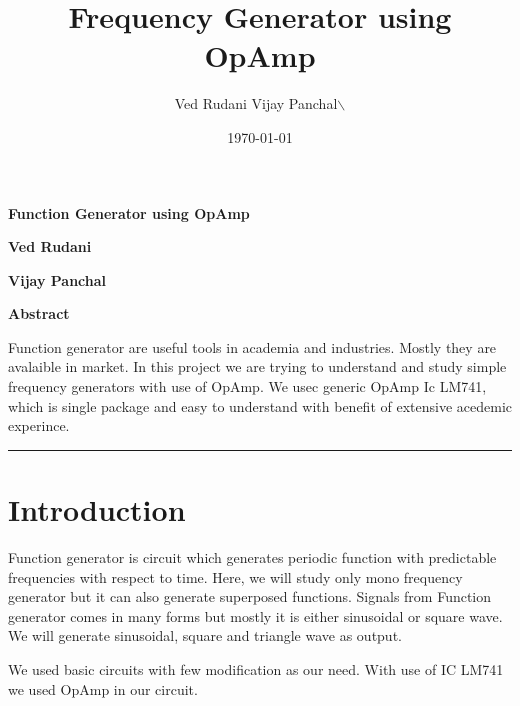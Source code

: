 \documentclass{article}
\author{Ved Rudani Vijay Panchal$\backslash$}
\date{\today}
\title{Frequency Generator using OpAmp}
\begin{document}
\maketitle
\tableofcontents

\pagebreak

\begin{center}
\Large
\textbf{Function Generator using OpAmp}


\vspace{0.9cm}
\normalsize
\textbf{Ved Rudani}


\textbf{Vijay Panchal}


\vspace{1.5cm}


\colorbox{bg1}{
\begin{minipage}{1\textwidth}\centering
        \vspace{1.5cm}
        \Large
        \textbf{Abstract}

        \begin{minipage}{0.7\textwidth}
        \vspace{.8cm}
        \normalsize
        Function generator are useful tools in academia and industries. Mostly they are avalaible in market. In this project we are trying to understand and study simple frequency generators with use of OpAmp. We usec generic OpAmp Ic LM741, which is single package and easy to understand with benefit of extensive acedemic experince.
        \vspace{1.5cm}
        \end{minipage}

\end{minipage}}

\vspace{1.5cm}
\noindent
\color{grey} \rule{\linewidth}{0.5mm}
\end{center}



\section{Introduction}
\label{sec:org2f2c9ec}
Function generator is circuit which generates periodic function with predictable frequencies with respect to time. Here, we will study only mono frequency generator but it can also generate superposed functions. Signals from Function generator comes in many forms but mostly it is either sinusoidal or square wave. We will generate sinusoidal, square and triangle wave as output. 

We used basic circuits with few modification as our need. With use of IC LM741 we used OpAmp in our circuit. 
\end{document}
